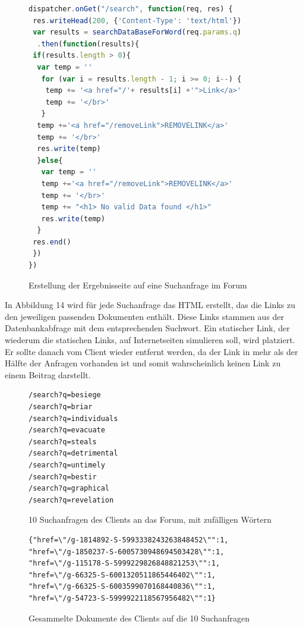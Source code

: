 \begin{figure}[h!]
\begin{lstlisting}[language=JavaScript]
dispatcher.onGet("/search", function(req, res) {
 res.writeHead(200, {'Content-Type': 'text/html'})
 var results = searchDataBaseForWord(req.params.q)
  .then(function(results){
 if(results.length > 0){
  var temp = ''
   for (var i = results.length - 1; i >= 0; i--) {
    temp += '<a href="/'+ results[i] +'">Link</a>'
    temp += '</br>'
   }
  temp +='<a href="/removeLink">REMOVELINK</a>'
  temp += '</br>'
  res.write(temp)
  }else{
   var temp = ''
   temp +='<a href="/removeLink">REMOVELINK</a>'
   temp += '</br>'
   temp += "<h1> No valid Data found </h1>"
   res.write(temp)
  }
 res.end() 
 }) 
})
\end{lstlisting}
\caption{Erstellung der Ergebnisseite auf eine Suchanfrage im Forum}
\end{figure}

In Abbildung 14 wird für jede Suchanfrage das HTML erstellt, das die Links zu den jeweiligen passenden Dokumenten enthält. Diese Links stammen aus der Datenbankabfrage mit dem entsprechenden Suchwort.
Ein statischer Link, der wiederum die statischen Links, auf Internetseiten simulieren soll, wird platziert. Er sollte danach vom Client wieder entfernt werden, da der Link in mehr als der Hälfte der Anfragen vorhanden ist und somit wahrscheinlich keinen Link zu einem Beitrag darstellt.

\begin{figure}[h!]
\begin{lstlisting}[language=HTML5]
/search?q=besiege
/search?q=briar
/search?q=individuals
/search?q=evacuate
/search?q=steals
/search?q=detrimental
/search?q=untimely
/search?q=bestir
/search?q=graphical
/search?q=revelation
\end{lstlisting}
\caption{10 Suchanfragen des Clients an das Forum, mit zufälligen Wörtern}
\end{figure}

\begin{figure}[h!]
\begin{lstlisting}[language=HTML5]
{"href=\"/g-1814892-S-5993338243263848452\"":1,
"href=\"/g-1850237-S-6005730948694503428\"":1,
"href=\"/g-115178-S-5999229826848821253\"":1,
"href=\"/g-66325-S-6001320511865446402\"":1,
"href=\"/g-66325-S-6003599070168440836\"":1,
"href=\"/g-54723-S-5999922118567956482\"":1}
\end{lstlisting}
\caption{Gesammelte Dokumente des Clients auf die 10 Suchanfragen}
\end{figure}

